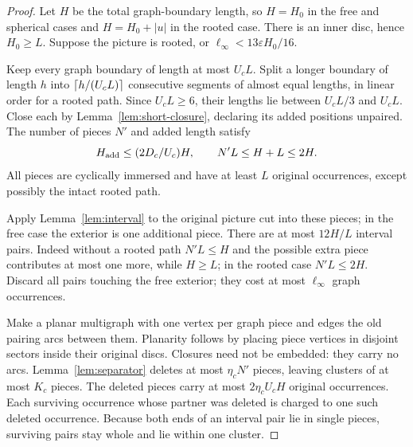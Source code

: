 \begin{proof}
Let $H$ be the total graph-boundary length, so $H=H_0$ in the free and spherical cases and $H=H_0+|u|$ in the rooted case. There is an inner disc, hence $H_0\ge L$. Suppose the picture is rooted, or $\ell_\infty<13\varepsilon H_0/16$.

Keep every graph boundary of length at most $U_cL$. Split a longer boundary of length $h$ into $\left\lceil h/(U_cL)\right\rceil$ consecutive segments of almost equal lengths, in linear order for a rooted path. Since $U_cL\ge6$, their lengths lie between $U_cL/3$ and $U_cL$. Close each by Lemma~\ref{lem:short-closure}, declaring its added positions unpaired. The number of pieces $N'$ and added length satisfy
\begin{equation}\label{eq:cone-pieces}
 H_{\rm add}\le(2D_c/U_c)H,
 \qquad N'L\le H+L\le2H.
\end{equation}
All pieces are cyclically immersed and have at least $L$ original occurrences, except possibly the intact rooted path.

Apply Lemma~\ref{lem:interval} to the original picture cut into these pieces; in the free case the exterior is one additional piece. There are at most $12H/L$ interval pairs. Indeed without a rooted path $N'L\le H$ and the possible extra piece contributes at most one more, while $H\ge L$; in the rooted case $N'L\le2H$. Discard all pairs touching the free exterior; they cost at most $\ell_\infty$ graph occurrences.

Make a planar multigraph with one vertex per graph piece and edges the old pairing arcs between them. Planarity follows by placing piece vertices in disjoint sectors inside their original discs. Closures need not be embedded: they carry no arcs. Lemma~\ref{lem:separator} deletes at most $\eta_cN'$ pieces, leaving clusters of at most $K_c$ pieces. The deleted pieces carry at most $2\eta_cU_cH$ original occurrences. Each surviving occurrence whose partner was deleted is charged to one such deleted occurrence. Because both ends of an interval pair lie in single pieces, surviving pairs stay whole and lie within one cluster.


\end{proof}
